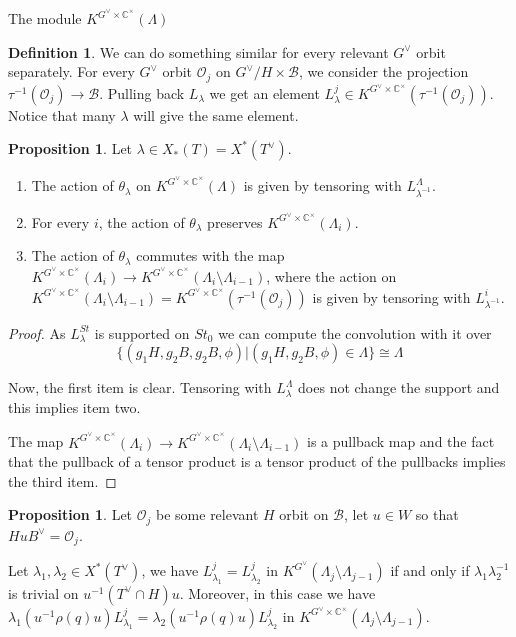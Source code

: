 \documentclass[12pt]{article}
\newcommand{\B}{\mathcal{B}}
\newcommand{\C}{\mathbb{C}}
\newcommand{\s}{\mathcal{O}}
\newcommand{\<}{\langle}
\renewcommand{\>}{\rangle}
\theoremstyle{plain}
\theoremstyle{definition}
\newtheorem{prop}[theorem]{Proposition}
\newtheorem{defn}[theorem]{Definition}
\begin{document}
\begin{section}{The module $K^{G^\vee\times \C^\times}(\Lambda)$}
\begin{defn}
We can do something similar for every  relevant $G^\vee$ orbit separately. For every $G^\vee$ orbit $\s_j$ on $G^\vee/H\times \B$,  we consider the projection $\tau^{-1}(\s_j)\rightarrow \B$. Pulling back $L_\lambda$ we get an element $L^{j}_\lambda\in K^{G^\vee\times\C^\times}(\tau^{-1}(\s_j))$. Notice that many $\lambda$ will give the same element. 
\end{defn}

\begin{prop}\label{torus action}
Let $\lambda\in X_*(T)=X^*(T^\vee)$.
\begin{enumerate}
    \item The action of $\theta_\lambda$ on $K^{G^\vee\times\C^\times}(\Lambda)$ is given by tensoring with  $L_{\lambda^{-1}}^\Lambda$.
    \item For every $i$, the action of $\theta_\lambda$ preserves $K^{G^\vee\times\C^\times}(\Lambda_i)$.
    \item The action of $\theta_\lambda$ commutes with the map $K^{G^\vee\times\C^\times}(\Lambda_i)\rightarrow K^{G^\vee\times\C^\times}(\Lambda_i\setminus \Lambda_{i-1})$, where the action on $K^{G^\vee\times\C^\times}(\Lambda_i\setminus \Lambda_{i-1})=K^{G^\vee\times\C^\times}(\tau^{-1}(\s_j))$ is given by tensoring with $L^{i}_{\lambda^{-1}}$.
\end{enumerate}
    
\end{prop}

\begin{proof}
    As $L^{St}_\lambda$ is supported on $St_0$ we can compute the convolution with it over 
    $$\{(g_1H,g_2B,g_2B,\phi)|(g_1H,g_2B,\phi)\in \Lambda\}\cong \Lambda$$

    Now, the first item is clear. Tensoring with $L^{\Lambda}_\lambda$ does not change the support and this implies item two.

    The map $K^{G^\vee\times\C^\times}(\Lambda_i)\rightarrow K^{G^\vee\times\C^\times}(\Lambda_i\setminus \Lambda_{i-1})$ is a pullback map and the fact that the pullback of a tensor product is a tensor product of the pullbacks implies the third item. 
\end{proof}

\begin{prop}\label{kernel on zero level}
Let $\s_j$ be some relevant $H$ orbit on $\B$, let $u\in W$ so that $HuB^\vee=\s_j$. 

Let $\lambda_1,\lambda_2\in X^*(T^\vee)$, we have $L^j_{\lambda_1}=L^j_{\lambda_2}$ in $K^{G^\vee}(\Lambda_j\setminus\Lambda_{j-1})$ if and only if $\lambda_1\lambda^{-1}_2$ is trivial on  $u^{-1}(T^\vee\cap H)u$. Moreover, in this case we have $\lambda_1(u^{-1}\rho(q)u)L^j_{\lambda_1}=\lambda_2(u^{-1}\rho(q)u)L^j_{\lambda_2}$ in $K^{G^\vee\times \C^\times}(\Lambda_j\setminus\Lambda_{j-1})$.   



\end{prop}
\end{section}
\end{document}
